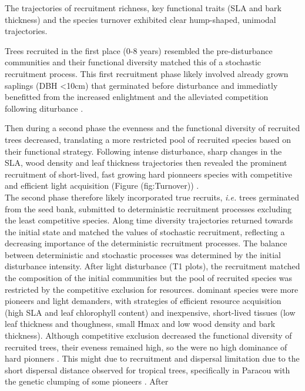 \documentclass[fleqn,10pt]{ArtEcoFoG} %
\begin{document}
The trajectories of recruitment richness, key functional traits (SLA and
bark thickness) and the species turnover exhibited clear hump-shaped,
unimodal trajectories.

Trees recruited in the first place (0-8 years) resembled the
pre-disturbance communities and their functional diversity matched this
of a stochastic recruitment process. This first recruitment phase likely
involved already grown saplings (DBH \textless{}10cm) that germinated
before disturbance and immediatly benefitted from the increased
enlightment and the alleviated competition following diturbance
\citep{Herault2010}.

Then during a second phase the evenness and the functional diversity of
recruited trees decreased, translating a more restricted pool of
recruited species based on their functional strategy. Following intense
disturbance, sharp changes in the SLA, wood density and leaf thickness
trajectories then revealed the prominent recruitment of short-lived,
fast growing hard pionneers species with competitive and efficient light
acquisition (Figure \citet{ref}(fig:Turnover))
\citep{Wright2004, Chave2009b, Herault2011, Reich2014}.\\
The second phase therefore likely incorporated true recruits,
\emph{i.e.} trees germinated from the seed bank, submitted to
deterministic recruitment processes excluding the least competitive
species. Along time diversity trajectories returned towards the initial
state and matched the values of stochastic recruitment, reflecting a
decreasing importance of the deterministic recruitment processes. The
balance between deterministic and stochastic processes was determined by
the initial disturbance intensity. After light disturbance (T1 plots),
the recruitment matched the composition of the initial communities but
the pool of recruited species was restricted by the competitive
exclusion for resources. dominant species were more pioneers and light
demanders, with strategies of efficient resource acquisition (high SLA
and leaf chlorophyll content) and inexpensive, short-lived tissues (low
leaf thickness and thoughness, small Hmax and low wood density and bark
thickness). Although competitive exclusion decreased the functional
diversity of recruited trees, their eveness remained high, so the were
no high dominance of hard pionners
\citep{Hubbell1999, Sheil2003, Bongers2009}. This might due to
recruitment and dispersal limitation due to the short dispersal distance
observed for tropical trees, specifically in Paracou with the genetic
clumping of some pioneers \citep{Leclerc2015, Scotti2015a}. After
\end{document}
